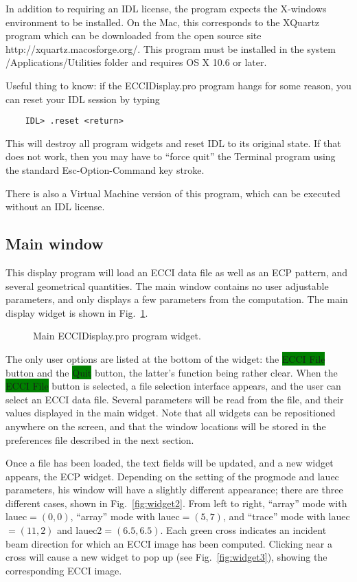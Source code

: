 \documentclass[DIV=calc, paper=letter, fontsize=11pt]{scrartcl}	 %
\newcommand{\button}[1]{\colorbox{green}{\textsf{#1}} button}
\begin{document}
In addition to requiring an IDL license, the program expects the X-windows environment to be installed.  On the Mac, this corresponds
to the \textsf{XQuartz} program which can be downloaded from the open source site \textsf{http://xquartz.macosforge.org/}.  This program
must be installed in the system /Applications/Utilities folder and requires OS X 10.6 or later.

Useful thing to know: if the \textsf{ECCIDisplay.pro}  program hangs for some reason, you can reset your IDL session by typing
\begin{verbatim}
	IDL> .reset <return>
\end{verbatim}
This will destroy all program widgets and reset IDL to its original state.  If that does not work, then you may have to ``force quit'' the Terminal program
using the standard Esc-Option-Command key stroke.

There is also a Virtual Machine version of this program, which can be executed without an IDL license.

\subsection{Main window\label{sec:idlmain}}
This display program will load an ECCI data file as well as an ECP pattern, and several geometrical quantities.
The main window contains no user adjustable parameters, and only displays a few parameters from the computation.
The main display widget is shown in Fig.~\ref{fig:widget1}.  

\begin{figure}[h]
\leavevmode\centering
{}
\caption{\label{fig:widget1}Main \textsf{ECCIDisplay.pro} program widget.}
\end{figure}

The only user options are listed at the bottom of the widget: the \button{ECCI File} and the \button{Quit}, the latter's function being 
rather clear.  When the \button{ECCI File} is selected, a file selection interface appears, and the user can select an ECCI data file. 
Several parameters will be read from the file, and their values displayed in the main widget.  Note that  all widgets 
can be repositioned anywhere on the screen, and that the window locations will be stored in the preferences file described in the next section.  

Once a file has been loaded, the text fields will be updated, and a new widget appears, the ECP widget.  Depending on the setting of the 
\textsf{progmode} and \textsf{lauec} parameters, his window will have a slightly different appearance; there are three different cases, 
shown in Fig.~\ref{fig:widget2}.  From left to right, ``array'' mode with \textsf{lauec}$=(0,0)$, ``array'' mode with \textsf{lauec}$=(5,7)$,
and ``trace'' mode with \textsf{lauec}$=(11,2)$ and \textsf{lauec2}$=(6.5,6.5)$.  Each green cross indicates an incident beam direction for
which an ECCI image has been computed.  Clicking near a cross will cause a new widget to pop up (see Fig.~\ref{fig:widget3}), showing the corresponding ECCI image.
\end{document}
